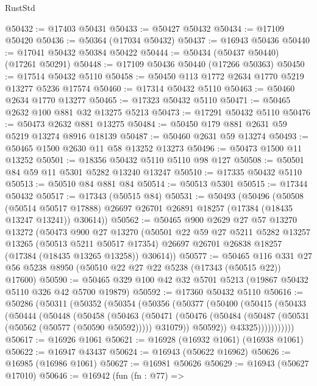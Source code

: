\begin{lexlean}{RustStd}
\begin{coremodule}
@50432 := @17403 @50431
@50433 := @50427 @50432
@50434 := @17109 @50420
@50436 := @50364 (@17034 @50432)
@50437 := @16943 @50436
@50440 := @17041 @50432 @50384 @50422
@50444 := @50434 (@50437 @50440) (@17261 @50291)
@50448 := @17109 @50436 @50440 (@17266 @50363)
@50450 := @17514 @50432 @5110
@50458 := @50450 @113 @1772 @2634 @1770 @5219 @13277 @5236 @17574
@50460 := @17314 @50432 @5110
@50463 := @50460 @2634 @1770 @13277
@50465 := @17323 @50432 @5110
@50471 := @50465 @2632 @100 @881 @32 @13275 @5213
@50473 := @17291 @50432 @5110
@50476 := @50473 @2632 @881 @13275
@50484 := @50450 @179 @881 @2631 @59 @5219 @13274 @8916 @18139
@50487 := @50460 @2631 @59 @13274
@50493 := @50465 @1500 @2630 @11 @58 @13252 @13273
@50496 := @50473 @1500 @11 @13252
@50501 := @18356 @50432 @5110 @5110 @98 @127
@50508 := @50501 @84 @59 @11 @5301 @5282 @13240 @13247
@50510 := @17335 @50432 @5110
@50513 := @50510 @84 @881 @84
@50514 := @50513 @5301
@50515 := @17344 @50432
@50517 := @17343 (@50515 @84)
@50531 := @50493
    (@50496
      (@50508
        (@50514 @50517 @17888)
        @26697
        @26701
        @26891
        @18257
        (@17384 (@18435 @13247 @13241))
        @30614))
@50562 := @50465
    @900
    @2629
    @27
    @57
    @13270
    @13272
    (@50473
      @900
      @27
      @13270
      (@50501
        @22
        @59
        @27
        @5211
        @5282
        @13257
        @13265
        (@50513 @5211 @50517 @17354)
        @26697
        @26701
        @26838
        @18257
        (@17384 (@18435 @13265 @13258))
        @30614))
@50577 := @50465
    @116
    @331
    @27
    @56
    @5238
    @8950
    (@50510 @22 @27 @22 @5238 (@17343 (@50515 @22)) @17600)
@50590 := @50465 @329 @100 @42 @32 @5701 @5213 (@19867 @50432 @5110 @326 @42 @5700 @19879)
@50592 := @17360 @50432 @5110
@50616 := @50286
    (@50311
      (@50352
        (@50354
          (@50356
            (@50377
              (@50400
                (@50415
                  (@50433
                    (@50444
                      (@50448
                        (@50458
                          (@50463
                            (@50471
                              (@50476
                                (@50484 (@50487 (@50531 (@50562 (@50577 (@50590 @50592))))) @31079))
                              @50592))
                          @43325)))))))))))
@50617 := @16926 @1061
@50621 := @16928 (@16932 @1061) (@16938 @1061)
@50622 := @16947 @43437
@50624 := @16943 (@50622 @16962)
@50626 := @16985 (@16986 @1061)
@50627 := @16981 @50626
@50629 := @16943 (@50627 @17010)
@50646 := @16942
    (fun (fn : @77) =>

\end{coremodule}
\end{lexlean}
